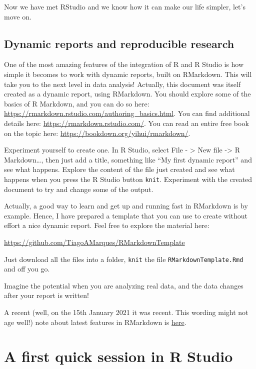 \documentclass[
]{article}
\begin{document}
Now we have met RStudio and we know how it can make our life simpler,
let's move on.

\hypertarget{dynamic-reports-and-reproducible-research}{%
\subsection{Dynamic reports and reproducible
research}\label{dynamic-reports-and-reproducible-research}}

One of the most amazing features of the integration of R and R Studio is
how simple it becomes to work with dynamic reports, built on RMarkdown.
This will take you to the next level in data analysis! Actually, this
document was itself created as a dynamic report, using RMarkdown. You
should explore some of the basics of R Markdown, and you can do so here:
\url{https://rmarkdown.rstudio.com/authoring_basics.html}. You can find
additional details here: \url{https://rmarkdown.rstudio.com/}. You can
read an entire free book on the topic here:
\url{https://bookdown.org/yihui/rmarkdown/}.

Experiment yourself to create one. In R Studio, select File -
\textgreater{} New file -\textgreater{} R Markdown\ldots, then just add
a title, something like ``My first dynamic report'' and see what
happens. Explore the content of the file just created and see what
happens when you press the R Studio button \texttt{knit}. Experiment
with the created document to try and change some of the output.

Actually, a good way to learn and get up and running fast in RMarkdown
is by example. Hence, I have prepared a template that you can use to
create without effort a nice dynamic report. Feel free to explore the
material here:

\url{https://github.com/TiagoAMarques/RMarkdownTemplate}

Just download all the files into a folder, \texttt{knit} the file
\texttt{RMarkdownTemplate.Rmd} and off you go.

Imagine the potential when you are analyzing real data, and the data
changes after your report is written!

A recent (well, on the 15th January 2021 it was recent. This wording
might not age well!) note about latest features in RMarkdown is
\href{https://blog.rstudio.com/2020/12/21/rmd-news/}{here}.

\hypertarget{a-first-quick-session-in-r-studio}{%
\section{A first quick session in R
Studio}\label{a-first-quick-session-in-r-studio}}
\end{document}
